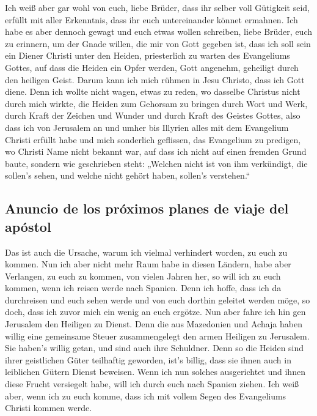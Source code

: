  Ich weiß aber gar wohl von euch, liebe Brüder, dass ihr
selber voll Gütigkeit seid, erfüllt mit aller Erkenntnis, dass ihr euch
untereinander könnet ermahnen.  Ich habe es aber dennoch
gewagt und euch etwas wollen schreiben, liebe Brüder, euch zu erinnern,
um der Gnade willen, die mir von Gott gegeben ist,  dass
ich soll sein ein Diener Christi unter den Heiden, priesterlich zu
warten des Evangeliums Gottes, auf dass die Heiden ein Opfer werden,
Gott angenehm, geheiligt durch den heiligen Geist.  Darum
kann ich mich rühmen in Jesu Christo, dass ich Gott diene.
 Denn ich wollte nicht wagen, etwas zu reden, wo dasselbe
Christus nicht durch mich wirkte, die Heiden zum Gehorsam zu bringen
durch Wort und Werk,  durch Kraft der Zeichen und Wunder
und durch Kraft des Geistes Gottes, also dass ich von Jerusalem an und
umher bis Illyrien alles mit dem Evangelium Christi erfüllt habe
 und mich sonderlich geflissen, das Evangelium zu
predigen, wo Christi Name nicht bekannt war, auf dass ich nicht auf
einen fremden Grund baute,  sondern wie geschrieben
steht: „Welchen nicht ist von ihm verkündigt, die sollen's sehen, und
welche nicht gehört haben, sollen's verstehen.``

\hypertarget{anuncio-de-los-pruxf3ximos-planes-de-viaje-del-apuxf3stol}{%
\subsection{Anuncio de los próximos planes de viaje del
apóstol}\label{anuncio-de-los-pruxf3ximos-planes-de-viaje-del-apuxf3stol}}

 Das ist auch die Ursache, warum ich vielmal verhindert
worden, zu euch zu kommen.  Nun ich aber nicht mehr Raum
habe in diesen Ländern, habe aber Verlangen, zu euch zu kommen, von
vielen Jahren her,  so will ich zu euch kommen, wenn ich
reisen werde nach Spanien. Denn ich hoffe, dass ich da durchreisen und
euch sehen werde und von euch dorthin geleitet werden möge, so doch,
dass ich zuvor mich ein wenig an euch ergötze.  Nun aber
fahre ich hin gen Jerusalem den Heiligen zu Dienst.  Denn
die aus Mazedonien und Achaja haben willig eine gemeinsame Steuer
zusammengelegt den armen Heiligen zu Jerusalem.  Sie
haben's willig getan, und sind auch ihre Schuldner. Denn so die Heiden
sind ihrer geistlichen Güter teilhaftig geworden, ist's billig, dass sie
ihnen auch in leiblichen Gütern Dienst beweisen.  Wenn
ich nun solches ausgerichtet und ihnen diese Frucht versiegelt habe,
will ich durch euch nach Spanien ziehen.  Ich weiß aber,
wenn ich zu euch komme, dass ich mit vollem Segen des Evangeliums
Christi kommen werde.

